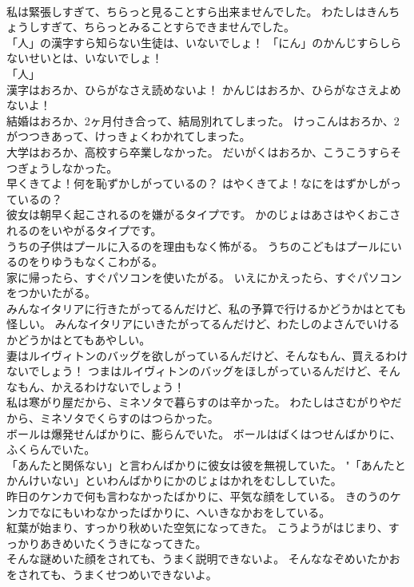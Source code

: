\documentclass[8pt]{extreport}
\begin{document}
\begin{CJK}{UTF8}{min}
\\	私は緊張しすぎて、ちらっと見ることすら出来ませんでした。	わたしはきんちょうしすぎて、ちらっとみることすらできませんでした。 
\\	「人」の漢字すら知らない生徒は、いないでしょ！	「にん」のかんじすらしらないせいとは、いないでしょ！ 
\\	「人」 
\\	漢字はおろか、ひらがなさえ読めないよ！	かんじはおろか、ひらがなさえよめないよ！ 
\\	結婚はおろか、2ヶ月付き合って、結局別れてしまった。	けっこんはおろか、2がつつきあって、けっきょくわかれてしまった。 
\\	大学はおろか、高校すら卒業しなかった。	だいがくはおろか、こうこうすらそつぎょうしなかった。 
\\	早くきてよ！何を恥ずかしがっているの？	はやくきてよ！なにをはずかしがっているの？ 
\\	彼女は朝早く起こされるのを嫌がるタイプです。	かのじょはあさはやくおこされるのをいやがるタイプです。 
\\	うちの子供はプールに入るのを理由もなく怖がる。	うちのこどもはプールにいるのをりゆうもなくこわがる。 
\\	家に帰ったら、すぐパソコンを使いたがる。	いえにかえったら、すぐパソコンをつかいたがる。 
\\	みんなイタリアに行きたがってるんだけど、私の予算で行けるかどうかはとても怪しい。	みんなイタリアにいきたがってるんだけど、わたしのよさんでいけるかどうかはとてもあやしい。 
\\	妻はルイヴィトンのバッグを欲しがっているんだけど、そんなもん、買えるわけないでしょう！	つまはルイヴィトンのバッグをほしがっているんだけど、そんなもん、かえるわけないでしょう！ 
\\	私は寒がり屋だから、ミネソタで暮らすのは辛かった。	わたしはさむがりやだから、ミネソタでくらすのはつらかった。 
\\	ボールは爆発せんばかりに、膨らんでいた。	ボールはばくはつせんばかりに、ふくらんでいた。 
\\	「あんたと関係ない」と言わんばかりに彼女は彼を無視していた。	"「あんたとかんけいない」といわんばかりにかのじょはかれをむししていた。 
\\	昨日のケンカで何も言わなかったばかりに、平気な顔をしている。	きのうのケンカでなにもいわなかったばかりに、へいきなかおをしている。 
\\	紅葉が始まり、すっかり秋めいた空気になってきた。	こうようがはじまり、すっかりあきめいたくうきになってきた。 
\\	そんな謎めいた顔をされても、うまく説明できないよ。	そんななぞめいたかおをされても、うまくせつめいできないよ。 

\end{CJK}
\end{document}
